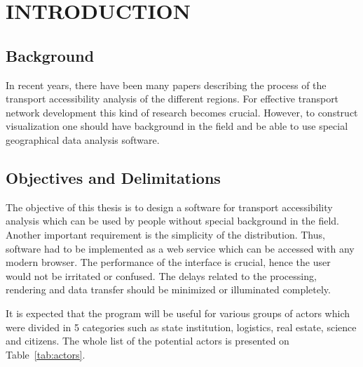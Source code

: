 \section{INTRODUCTION}

\subsection{Background}
In recent years, there have been many papers describing the process of the transport accessibility
analysis  of the different regions. For effective transport network development this kind
of research becomes crucial. However, to construct visualization one should have background
in the field and be able to use special geographical data analysis software.

\subsection{Objectives and Delimitations}
The objective of this thesis is to design a software for transport accessibility analysis
which can be used by people without special background in the field. Another important
requirement is the simplicity of the distribution. Thus, software had to be implemented
as a web service which can be accessed with any modern browser. The performance of the interface
is crucial, hence the user would not be irritated or confused. The delays related to the processing,
rendering and data transfer should be minimized or illuminated completely.

It is expected that the program will be useful for various groups of actors which
were divided in 5 categories such as state institution, logistics, real estate, science
and citizens. The whole list of the potential actors is presented on Table~\ref{tab:actors}.


